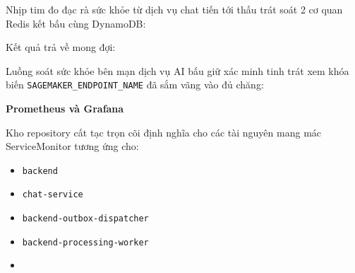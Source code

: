 Nhịp tim đo đạc rà sức khỏe từ dịch vụ chat tiến tới thấu trát soát 2 cơ
quan Redis kết bấu cùng DynamoDB:

\begin{Shaded}
\begin{Highlighting}[]
 
\end{Highlighting}
\end{Shaded}

Kết quả trả về mong đợi:

\begin{Shaded}
\begin{Highlighting}[]
\FunctionTok{\{}\FunctionTok{:}\FunctionTok{,}\FunctionTok{:\{}\FunctionTok{:}\FunctionTok{,}\FunctionTok{:}\FunctionTok{\}\}}
\end{Highlighting}
\end{Shaded}

Luồng soát sức khỏe bên mạn dịch vụ AI bấu giữ xác minh tinh trát xem
khóa biến \texttt{SAGEMAKER\_\allowbreak{}ENDPOINT\_\allowbreak{}NAME} đã sắm vãng vào đủ chăng:

\begin{Shaded}
\begin{Highlighting}[]
 
\end{Highlighting}
\end{Shaded}

\vspace{0.5em}\noindent\textbf{Prometheus và Grafana}\par

Kho repository cất tạc trọn cõi định nghĩa cho các tài nguyên mang mác
ServiceMonitor tương ứng cho:

\begin{itemize}
\tightlist
\item
  \texttt{backend}
\item
  \texttt{chat-\allowbreak{}service}
\item
  \texttt{backend-\allowbreak{}outbox-\allowbreak{}dispatcher}
\item
  \texttt{backend-\allowbreak{}processing-\allowbreak{}worker}
\item
\end{itemize}

